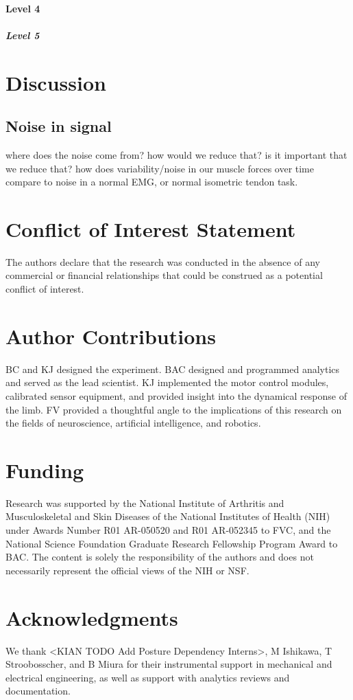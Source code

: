 \documentclass[utf8]{frontiersSCNS} %
\begin{document}
\paragraph{Level 4}
\subparagraph{Level 5}


\section{Discussion}
\subsection{Noise in signal}

where does the noise come from?
how would we reduce that?
is it important that we reduce that? how does variability/noise in our muscle forces over time compare to noise in a normal EMG, or normal isometric tendon task.

\section*{Conflict of Interest Statement}
The authors declare that the research was conducted in the absence of any commercial or financial relationships that could be construed as a potential conflict of interest.

\section*{Author Contributions}
BC and KJ designed the experiment.
BAC designed and programmed analytics and served as the lead scientist.
KJ implemented the motor control modules, calibrated sensor equipment, and provided insight into the dynamical response of the limb.
FV provided a thoughtful angle to the implications of this research on the fields of neuroscience, artificial intelligence, and robotics.

\section*{Funding}
Research was supported by the National Institute of Arthritis and Musculoskeletal and Skin Diseases of
the National Institutes of Health (NIH) under Awards Number R01 AR-050520 and R01 AR-052345 to FVC, and
the National Science Foundation Graduate Research Fellowship Program Award to BAC.
The content is solely the responsibility of the authors and does not necessarily represent the official views of the NIH or NSF.

\section*{Acknowledgments}
We thank <KIAN TODO Add Posture Dependency Interns>, M Ishikawa, T Stroobosscher, and B Miura for their instrumental support in mechanical and electrical engineering, as well as support with analytics reviews and documentation.
\end{document}
